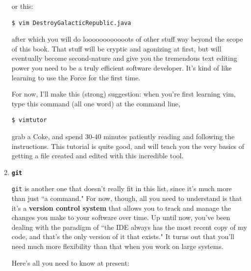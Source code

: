 \begin{enumerate}
or this:

\begin{verbatim}
$ vim DestroyGalacticRepublic.java
\end{verbatim}

after which you will do loooooooooooots of other stuff way beyond the scope of
this book. That stuff will be cryptic and agonizing at first, but will
eventually become second-nature and give you the tremendous text editing power
you need to be a truly efficient software developer. It's kind of like
learning to use the Force for the first time.

For now, I'll make this (strong) suggestion: when you're first learning vim,
type this command (all one word) at the command line,

\begin{verbatim}
$ vimtutor
\end{verbatim}

grab a Coke, and spend 30-40 minutes patiently reading and following the
instructions. This tutorial is quite good, and will teach you the very basics
of getting a file created and edited with this incredible tool.

\bigline

\item \textbf{\texttt{git}}

\texttt{git} is another one that doesn't really fit in this list, since it's
much more than just ``a command." For now, though, all you need to understand
is that it's a \textbf{version control system} that allows you to track and
manage the changes you make to your software over time. Up until now, you've
been dealing with the paradigm of ``the IDE always has the most recent copy of
my code, and that's the only version of it that exists." It turns out that
you'll need much more flexibility than that when you work on large systems.

Here's all you need to know at present:


\end{enumerate}
